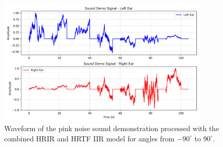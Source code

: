 \begin{figure}[H]
    \centering
    \includegraphics[width=0.9\textwidth]{data/figures/task_5/sound_demo_signal.png}
    \caption{Waveform of the pink noise sound demonstration processed with the combined HRIR and HRTF IIR model for angles from \(-90^\circ\) to \(90^\circ\).}
    \label{fig:sound_demo_waveform}
\end{figure}

